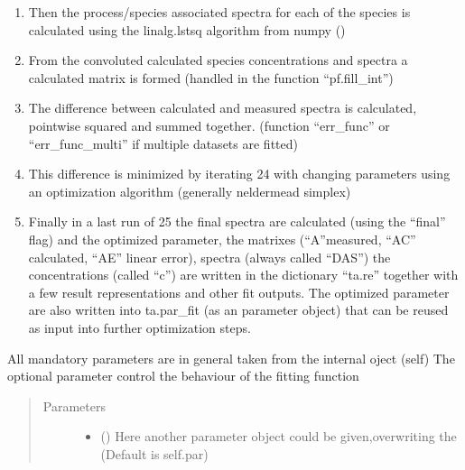 \documentclass[letterpaper,10pt,english]{sphinxmanual}
\begin{document}
\begin{fulllineitems}
\begin{fulllineitems}
\begin{description}
\begin{enumerate}
\item {} 
Then the process/species associated spectra for each of the species is calculated
using the linalg.lstsq algorithm from numpy
()

\item {} 
From the convoluted calculated species concentrations and spectra a calculated matrix
is formed (handled in the function “pf.fill\_int”)

\item {} 
The difference between calculated and measured spectra is calculated, point\sphinxhyphen{}wise squared
and summed together. (function “err\_func” or “err\_func\_multi” if multiple datasets are fitted)

\item {} 
This difference is minimized by iterating 2\sphinxhyphen{}4 with changing parameters using an
optimization algorithm (generally nelder\sphinxhyphen{}mead simplex)

\item {} 
Finally in a last run of 2\sphinxhyphen{}5 the final spectra are calculated (using the “final” flag)
and the optimized parameter, the matrixes
(“A”\sphinxhyphen{}measured, “AC” \sphinxhyphen{} calculated, “AE” \sphinxhyphen{} linear error),
spectra (always called “DAS”) the concentrations (called “c”)
are written in the dictionary “ta.re” together with a few result representations
and other fit outputs. The optimized parameter are also written into ta.par\_fit
(as an parameter object) that can be re\sphinxhyphen{}used as input into further optimization steps.

\end{enumerate}

\end{description}

All mandatory parameters are in general taken from the internal oject (self) The optional parameter control the behaviour of the fitting function
\begin{quote}\begin{description}
\item[{Parameters}] \leavevmode\begin{itemize}
\item {} 
 (\sphinxstyleliteralemphasis{\sphinxupquote{, }}) \textendash{} Here another parameter object could be given,overwriting the (Default is self.par)


\end{itemize}
\end{description}
\end{quote}
\end{fulllineitems}
\end{fulllineitems}
\end{document}
